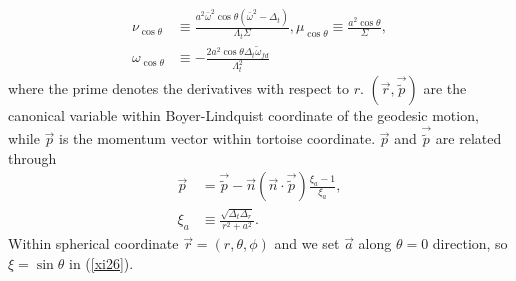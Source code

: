 \documentclass[prd,aps,a4paper,superscriptaddress,twocolumn,footinbib,showpacs]{revtex4}
\begin{document}
\begin{widetext}
\begin{align}
\nu_{\cos\theta}&\equiv\frac{a^2\bar{\omega}^2\cos\theta(\bar{\omega}^2-\Delta_t)}{\Lambda_t\Sigma},
\mu_{\cos\theta}\equiv\frac{a^2\cos\theta}{\Sigma},\\
\omega_{\cos\theta}&\equiv-\frac{2a^2\cos\theta\Delta_t\tilde{\omega}_{fd}}{\Lambda_t^2}
\end{align}
where the prime denotes the derivatives with respect to $r$. $(\vec{r},\vec{\tilde{p}})$ are the canonical variable within Boyer-Lindquist coordinate of the geodesic motion, while $\vec{p}$ is the momentum vector within tortoise coordinate. $\vec{p}$ and $\vec{\tilde{p}}$ are related through \cite{PhysRevD.81.084041}
\begin{align}
\vec{p}&=\vec{\tilde{p}}-\vec{n}(\vec{n}\cdot\vec{\tilde{p}})\frac{\xi_a-1}{\xi_a},\\
\xi_a&\equiv\frac{\sqrt{\Delta_t\Delta_r}}{r^2+a^2}.
\end{align}
Within spherical coordinate $\vec{r}=(r,\theta,\phi)$ and we set $\vec{a}$ along $\theta=0$ direction, so $\xi=\sin\theta$ in (\ref{xi26}).


\end{widetext}
\end{document}
